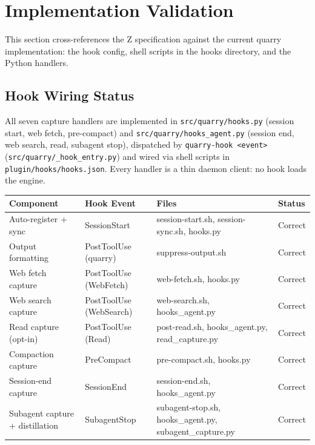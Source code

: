 \documentclass[a4paper,10pt,fleqn]{article}
\begin{document}
\section{Implementation Validation}

This section cross-references the Z specification against
the current quarry implementation: the hook config, shell
scripts in the hooks directory, and the Python handlers.

\subsection{Hook Wiring Status}

All seven capture handlers are implemented in
\texttt{src/quarry/hooks.py} (session start, web fetch, pre-compact)
and \texttt{src/quarry/hooks\_agent.py} (session end, web search,
read, subagent stop), dispatched by \texttt{quarry-hook <event>}
(\texttt{src/quarry/\_hook\_entry.py}) and wired via shell scripts in
\texttt{plugin/hooks/hooks.json}.  Every handler is a thin daemon
client: no hook loads the engine.

{\small
\begin{tabular}{lp{3cm}p{5cm}l}
\hline
\textbf{Component} & \textbf{Hook Event} & \textbf{Files} &
  \textbf{Status} \\
\hline
Auto-register + sync & SessionStart &
  session-start.sh, session-sync.sh, hooks.py & Correct \\
Output formatting & PostToolUse (quarry) &
  suppress-output.sh & Correct \\
Web fetch capture & PostToolUse (WebFetch) &
  web-fetch.sh, hooks.py & Correct \\
Web search capture & PostToolUse (WebSearch) &
  web-search.sh, hooks\_agent.py & Correct \\
Read capture (opt-in) & PostToolUse (Read) &
  post-read.sh, hooks\_agent.py, read\_capture.py & Correct \\
Compaction capture & PreCompact &
  pre-compact.sh, hooks.py & Correct \\
Session-end capture & SessionEnd &
  session-end.sh, hooks\_agent.py & Correct \\
Subagent capture + distillation & SubagentStop &
  subagent-stop.sh, hooks\_agent.py, subagent\_capture.py & Correct \\
\hline
\end{tabular}
}
\end{document}
